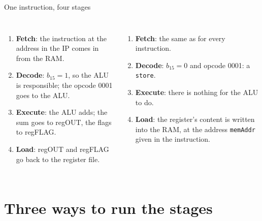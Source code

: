 \documentclass[10pt]{wosm-slides}
\begin{document}
\begin{frame}{One instruction, four stages}
  \begin{columns}[T, totalwidth=\textwidth]
      \begin{enumerate}
        \item \textbf{Fetch}: the instruction at the address in the IP comes in
          from the RAM.
        \item \textbf{Decode}: $b_{15} = 1$, so the ALU is responsible; the opcode
          0001 goes to the ALU.
        \item \textbf{Execute}: the ALU adds; the sum goes to regOUT, the flags to
          regFLAG.
        \item \textbf{Load}: regOUT and regFLAG go back to the register file.
      \end{enumerate}
      \begin{enumerate}
        \item \textbf{Fetch}: the same as for every instruction.
        \item \textbf{Decode}: $b_{15} = 0$ and opcode 0001: a \texttt{store}.
        \item \textbf{Execute}: there is nothing for the ALU to do.
        \item \textbf{Load}: the register's content is written into the RAM, at
          the address \texttt{memAddr} given in the instruction.
      \end{enumerate}
  \end{columns}
\end{frame}

\section{Three ways to run the stages}
\end{document}
